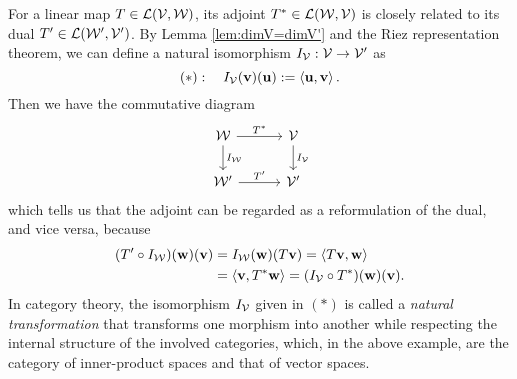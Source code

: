 \begin{rem}
  \label{rem:adjointAndDual}
  For a linear map $T\in {\cal L}({\cal V},{\cal W})$,
  its adjoint $T^*\in {\cal L}({\cal W},{\cal V})$
  is closely related to
  its dual $T'\in {\cal L}({\cal W}',{\cal V}')$.
  By Lemma \ref{lem:dimV=dimV'}
   and the Riez representation theorem, 
   we can define a natural isomorphism
   $I_{{\cal V}}: {\cal V}\rightarrow {\cal V}'$
   as
   \begin{displaymath}
     (*):\quad
     I_{{\cal V}}(\mathbf{v})(\mathbf{u})
     := \left\langle \mathbf{u},\mathbf{v} \right\rangle.
   \end{displaymath}
   Then we have the commutative diagram 
   \begin{displaymath}
     \begin{tikzcd}[column sep=3em]
       {\cal W} \ar{r}{T^*} 
       \ar{d}{I_{\cal W}}
       & {\cal V}
       \ar{d}{I_{\cal V}}
       \\
       {\cal W}' \ar{r}{T'}
       & {\cal V}' 
     \end{tikzcd}
   \end{displaymath}
   which tells us that the adjoint
   can be regarded as a reformulation of the dual, 
   and vice versa, because
   \begin{align*}
     (T'\circ I_{\cal W})(\mathbf{w})(\mathbf{v})
     &= I_{\cal W}(\mathbf{w})(T\mathbf{v})
     = \left\langle T\mathbf{v}, \mathbf{w} \right\rangle
     \\
     &= \left\langle \mathbf{v}, T^*\mathbf{w} \right\rangle
     = (I_{\cal V}\circ T^*)(\mathbf{w})(\mathbf{v}).
   \end{align*}
   In category theory, 
   the isomorphism $I_{\cal V}$ given in $(*)$
   is called a \emph{natural transformation}
   that transforms one morphism into another
   while respecting the internal structure
   of the involved categories,
   which, in the above example,
   are the category of inner-product spaces
   and that of vector spaces.
\end{rem}

